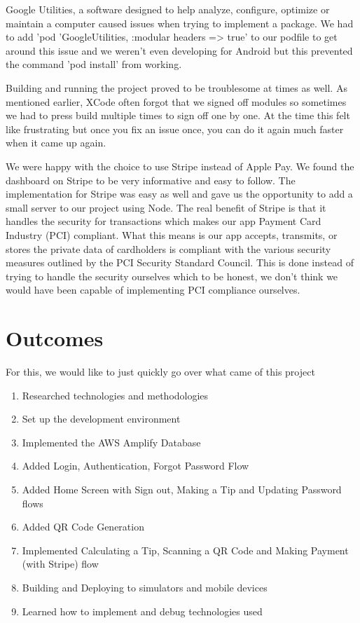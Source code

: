 Google Utilities, a software designed to help analyze, configure, optimize or maintain a computer caused issues when trying to implement a package. We had to add 'pod 'GoogleUtilities, :modular headers => true' to our podfile to get around this issue and we weren't even developing for Android but this prevented the command 'pod install' from working.

Building and running the project proved to be troublesome at times as well. As mentioned earlier, XCode often forgot that we signed off modules so sometimes we had to press build multiple times to sign off one by one. At the time this felt like frustrating but once you fix an issue once, you can do it again much faster when it came up again.

We were happy with the choice to use Stripe instead of Apple Pay. We found the dashboard on Stripe to be very informative and easy to follow. The implementation for Stripe was easy as well and gave us the opportunity to add a small server to our project using Node. The real benefit of Stripe is that it handles the security for transactions which makes our app Payment Card Industry (PCI) compliant. What this means is our app accepts, transmits, or stores the private data of cardholders is compliant with the various security measures outlined by the PCI Security Standard Council. This is done instead of trying to handle the security ourselves which to be honest, we don't think we would have been capable of implementing PCI compliance ourselves. 
\section{Outcomes}
For this, we would like to just quickly go over what came of this project
\begin{enumerate}
  \item Researched technologies and methodologies
  \item Set up the development environment
  \item Implemented the AWS Amplify Database
  \item Added Login, Authentication, Forgot Password Flow
  \item Added Home Screen with Sign out, Making a Tip and Updating Password flows
  \item Added QR Code Generation
   \item Implemented Calculating a Tip, Scanning a QR Code and Making Payment (with Stripe) flow 
   \item Building and Deploying to simulators and mobile devices
   \item Learned how to implement and debug technologies used
\end{enumerate}

